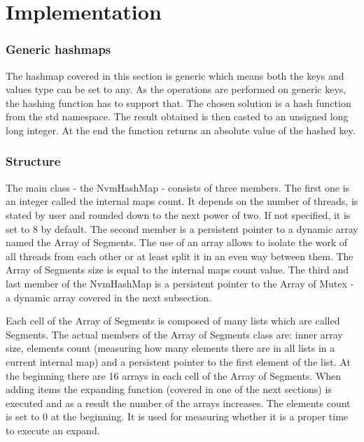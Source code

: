 \section{Implementation}

    \subsubsection{Generic hashmaps} %
        The hashmap covered in this section is generic which means both the keys and values type can be set to any. As the operations are performed on generic keys, the hashing function has to support that. The chosen solution is a hash function from the std namespace. The result obtained is then casted to an unsigned long long integer. At the end the function returns an absolute value of the hashed key.

    \subsubsection{Structure} %
        The main class - the NvmHashMap - consists of three members. The first one is an integer called the internal maps count. It depends on the number of threads, is stated by user and rounded down to the next power of two. If not specified, it is set to 8 by default. The second member is a persistent pointer to a dynamic array named the Array of Segments. The use of an array allows to isolate the work of all threads from each other or at least split it in an even way between them. The Array of Segments size is equal to the internal maps count value. The third and last member of the NvmHashMap is a persistent pointer to the Array of Mutex - a dynamic array covered in the next subsection.
        
        Each cell of the Array of Segments is composed of many lists which are called Segments. The actual members of the Array of Segments class are: inner array size, elements count (measuring how many elements there are in all lists in a current internal map) and a persistent pointer to the first element of the list. At the beginning there are 16 arrays in each cell of the Array of Segments. When adding items the expanding function (covered in one of the next sections) is executed and as a result the number of the arrays increases. The elements count is set to 0 at the beginning. It is used for measuring whether it is a proper time to execute an expand.
        
